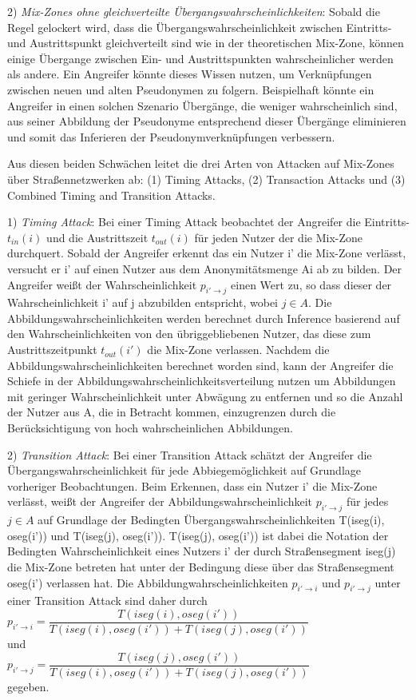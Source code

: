 2)	\textit{Mix-Zones ohne gleichverteilte Übergangswahrscheinlichkeiten}: Sobald die Regel gelockert wird, dass die Übergangswahrscheinlichkeit zwischen Eintritts- und Austrittspunkt gleichverteilt sind wie in der theoretischen Mix-Zone, können einige Übergange zwischen Ein- und Austrittspunkten wahrscheinlicher werden als andere. Ein Angreifer könnte dieses Wissen nutzen, um  Verknüpfungen zwischen neuen und alten Pseudonymen zu folgern. Beispielhaft könnte ein Angreifer in einen solchen Szenario Übergänge, die weniger wahrscheinlich sind, aus seiner Abbildung der Pseudonyme entsprechend dieser Übergänge eliminieren und somit das Inferieren der Pseudonymverknüpfungen verbessern.

Aus diesen beiden Schwächen leitet \cite{Palanisamy2015} die drei Arten von Attacken auf Mix-Zones über Straßennetzwerken ab: (1) Timing Attacks, (2) Transaction Attacks und (3) Combined  Timing and Transition Attacks.

1)	\textit{Timing Attack}: Bei einer Timing Attack beobachtet der Angreifer die Eintritts- $t_{in}(i)$ und die Austrittszeit $t_{out}(i)$ für jeden Nutzer der die Mix-Zone durchquert. Sobald der Angreifer erkennt das ein Nutzer i' die Mix-Zone verlässt, versucht er i' auf einen Nutzer aus dem Anonymitätsmenge Ai ab zu bilden. Der Angreifer weißt der Wahrscheinlichkeit $p_{i'\rightarrow j}$ einen Wert zu, so dass dieser der Wahrscheinlichkeit i' auf j abzubilden entspricht, wobei $j \in A$. Die Abbildungswahrscheinlichkeiten werden berechnet durch Inference basierend auf den Wahrscheinlichkeiten von den übriggebliebenen Nutzer, das diese zum Austrittszeitpunkt $t_{out}(i')$ die Mix-Zone verlassen.  Nachdem die Abbildungswahrscheinlichkeiten berechnet worden sind, kann der Angreifer die Schiefe in der Abbildungswahrscheinlichkeitsverteilung nutzen um Abbildungen mit geringer Wahrscheinlichkeit  unter Abwägung zu entfernen und so die Anzahl der Nutzer aus A, die in Betracht kommen, einzugrenzen durch die Berücksichtigung von hoch wahrscheinlichen  Abbildungen.

2)	\textit{Transition Attack}: Bei einer Transition Attack schätzt der Angreifer die Übergangswahrscheinlichkeit für jede Abbiegemöglichkeit auf Grundlage vorheriger Beobachtungen. Beim Erkennen, dass ein Nutzer i' die Mix-Zone verlässt, weißt der Angreifer der Abbildungswahrscheinlichkeit $p_{i'\rightarrow j}$  für jedes $j \in A$ auf Grundlage der Bedingten Übergangswahrscheinlichkeiten T(iseg(i), oseg(i')) und T(iseg(j), oseg(i')).  T(iseg(j), oseg(i')) ist dabei die Notation der Bedingten Wahrscheinlichkeit eines Nutzers i' der durch Straßensegment iseg(j) die Mix-Zone betreten hat unter der Bedingung diese über das Straßensegment oseg(i') verlassen hat. Die Abbildungwahrscheinlichkeiten  $p_{i'\rightarrow i}$ und $p_{i'\rightarrow j}$ unter einer Transition Attack sind daher durch \\
$p_{i'\rightarrow i} = \dfrac{T(iseg(i), oseg(i'))}{T(iseg(i), oseg(i')) + T(iseg(j), oseg(i'))} $\\
 und \\
  $p_{i'\rightarrow j} = \dfrac{T(iseg(j), oseg(i'))}{T(iseg(i), oseg(i')) + T(iseg(j), oseg(i'))} $ \\ gegeben.
  
